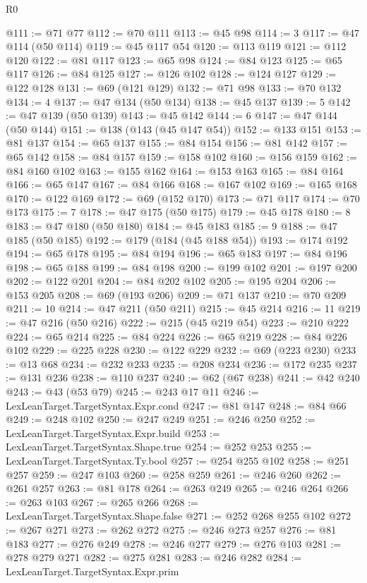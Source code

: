 \begin{lexlean}{R0}
\begin{coremodule}
@111 := @71 @77
@112 := @70 @111
@113 := @45 @98
@114 := 3
@117 := @47 @114 (@50 @114)
@119 := @45 @117 @54
@120 := @113 @119
@121 := @112 @120
@122 := @81 @117
@123 := @65 @98
@124 := @84 @123
@125 := @65 @117
@126 := @84 @125
@127 := @126 @102
@128 := @124 @127
@129 := @122 @128
@131 := @69 (@121 @129)
@132 := @71 @98
@133 := @70 @132
@134 := 4
@137 := @47 @134 (@50 @134)
@138 := @45 @137
@139 := 5
@142 := @47 @139 (@50 @139)
@143 := @45 @142
@144 := 6
@147 := @47 @144 (@50 @144)
@151 := @138 (@143 (@45 @147 @54))
@152 := @133 @151
@153 := @81 @137
@154 := @65 @137
@155 := @84 @154
@156 := @81 @142
@157 := @65 @142
@158 := @84 @157
@159 := @158 @102
@160 := @156 @159
@162 := @84 @160 @102
@163 := @155 @162
@164 := @153 @163
@165 := @84 @164
@166 := @65 @147
@167 := @84 @166
@168 := @167 @102
@169 := @165 @168
@170 := @122 @169
@172 := @69 (@152 @170)
@173 := @71 @117
@174 := @70 @173
@175 := 7
@178 := @47 @175 (@50 @175)
@179 := @45 @178
@180 := 8
@183 := @47 @180 (@50 @180)
@184 := @45 @183
@185 := 9
@188 := @47 @185 (@50 @185)
@192 := @179 (@184 (@45 @188 @54))
@193 := @174 @192
@194 := @65 @178
@195 := @84 @194
@196 := @65 @183
@197 := @84 @196
@198 := @65 @188
@199 := @84 @198
@200 := @199 @102
@201 := @197 @200
@202 := @122 @201
@204 := @84 @202 @102
@205 := @195 @204
@206 := @153 @205
@208 := @69 (@193 @206)
@209 := @71 @137
@210 := @70 @209
@211 := 10
@214 := @47 @211 (@50 @211)
@215 := @45 @214
@216 := 11
@219 := @47 @216 (@50 @216)
@222 := @215 (@45 @219 @54)
@223 := @210 @222
@224 := @65 @214
@225 := @84 @224
@226 := @65 @219
@228 := @84 @226 @102
@229 := @225 @228
@230 := @122 @229
@232 := @69 (@223 @230)
@233 := @13 @68
@234 := @232 @233
@235 := @208 @234
@236 := @172 @235
@237 := @131 @236
@238 := @110 @237
@240 := @62 (@67 @238)
@241 := @42 @240
@243 := @43 (@53 @79)
@245 := @243 @17 @11
@246 := LexLeanTarget.TargetSyntax.Expr.cond
@247 := @81 @147
@248 := @84 @66
@249 := @248 @102
@250 := @247 @249
@251 := @246 @250
@252 := LexLeanTarget.TargetSyntax.Expr.build
@253 := LexLeanTarget.TargetSyntax.Shape.true
@254 := @252 @253
@255 := LexLeanTarget.TargetSyntax.Ty.bool
@257 := @254 @255 @102
@258 := @251 @257
@259 := @247 @103
@260 := @258 @259
@261 := @246 @260
@262 := @261 @257
@263 := @81 @178
@264 := @263 @249
@265 := @246 @264
@266 := @263 @103
@267 := @265 @266
@268 := LexLeanTarget.TargetSyntax.Shape.false
@271 := @252 @268 @255 @102
@272 := @267 @271
@273 := @262 @272
@275 := @246 @273 @257
@276 := @81 @183
@277 := @276 @249
@278 := @246 @277
@279 := @276 @103
@281 := @278 @279 @271
@282 := @275 @281
@283 := @246 @282
@284 := LexLeanTarget.TargetSyntax.Expr.prim

\end{coremodule}
\end{lexlean}
